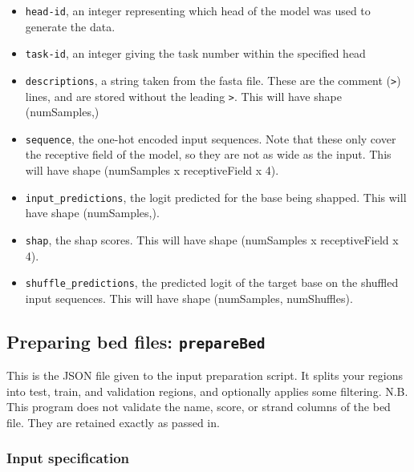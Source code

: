 \documentclass{article}
\begin{document}
\begin{itemize}
    \item \texttt{head-id}, an integer representing which head of the model was used to generate
        the data.
    \item \texttt{task-id}, an integer giving the task number within the specified head
    \item \texttt{descriptions}, a string taken from the fasta file. These are the comment
        (\texttt{>}) lines, and are stored without the leading \texttt{>}. This will
        have shape (numSamples,)
    \item \texttt{sequence}, the one-hot encoded input sequences. Note that these only cover
        the receptive field of the model, so they are not as wide as the input. This will have
        shape (numSamples x receptiveField x 4).
    \item \texttt{input\_predictions}, the logit predicted for the base being shapped.
        This will have shape (numSamples,).
    \item \texttt{shap}, the shap scores. This will have shape (numSamples x receptiveField x 4).
    \item \texttt{shuffle\_predictions}, the predicted logit of the target base on the shuffled
        input sequences. This will have shape (numSamples, numShuffles).
\end{itemize}




\newpage

\subsection{Preparing bed files: \texttt{prepareBed}}\label{prog:prepareBed}

This is the JSON file given to the input preparation script. It splits your regions into
test, train, and validation regions, and optionally applies some filtering.
N.B. This program does not validate the name, score, or strand columns of the bed file.
They are retained exactly as passed in.

\subsubsection{Input specification}
\end{document}
